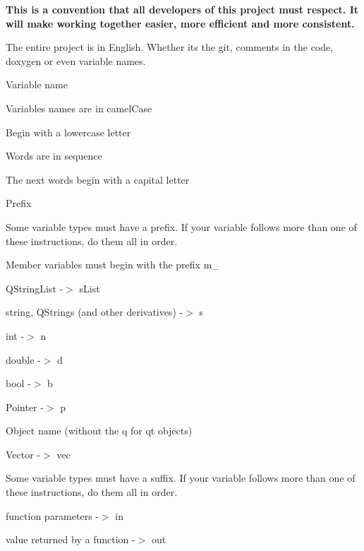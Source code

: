 {\bfseries{This is a convention that all developers of this project must respect. It will make working together easier, more efficient and more consistent.}}


\begin{DoxyItemize}
\item The entire project is in English. Whether it\textquotesingle{}s the git, comments in the code, doxygen or even variable names.
\item Variable name
\begin{DoxyItemize}
\item Variables names are in camel\+Case
\begin{DoxyItemize}
\item Begin with a lowercase letter
\item Words are in sequence
\begin{DoxyItemize}
\item The next words begin with a capital letter
\end{DoxyItemize}
\end{DoxyItemize}
\item Prefix
\begin{DoxyItemize}
\item Some variable types must have a prefix. If your variable follows more than one of these instructions, do them all in order.
\begin{DoxyItemize}
\item Member variables must begin with the prefix m\+\_\+
\item QString\+List -\/$>$ s\+List
\item string, QStrings (and other derivatives) -\/$>$ s
\item int -\/$>$ n
\item double -\/$>$ d
\item bool -\/$>$ b
\item Pointer -\/$>$ p
\item Object name (without the q for qt objects)
\item Vector -\/$>$ vec
\end{DoxyItemize}
\end{DoxyItemize}
\item Some variable types must have a suffix. If your variable follows more than one of these instructions, do them all in order.
\begin{DoxyItemize}
\item function parameters -\/$>$ in
\item value returned by a function -\/$>$ out

\end{DoxyItemize}
\end{DoxyItemize}
\end{DoxyItemize}
